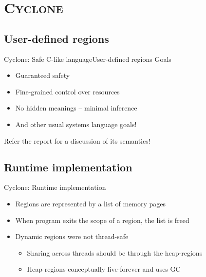 \documentclass[xcolor=x11names,compress]{beamer}
\renewcommand{\(}{\begin{columns}}
\renewcommand{\)}{\end{columns}}
\newcommand{\<}[1]{\begin{column}{#1}}
\renewcommand{\>}{\end{column}}
\begin{document}
\section{\scshape Cyclone}
\subsection{User-defined regions}
\begin{frame}{Cyclone: Safe C-like language}{User-defined regions}
    {\large Goals}
    \begin{itemize}
        \item Guaranteed safety
        \pause
        \item Fine-grained control over resources
        \pause
        \item No hidden meanings -- minimal inference
        \pause
        \item And other usual systems language goals!
    \end{itemize}
    \pause
    \vspace{1em}
    \small Refer the report for a discussion of its semantics!
\end{frame}

\subsection{Runtime implementation}
\begin{frame}{Cyclone: Runtime implementation}
    \begin{itemize}
        \item Regions are represented by a list of memory pages
        \pause
        \item When program exits the scope of a region, the list is freed
        \pause
        \item Dynamic regions were not thread-safe
        \pause
        \begin{itemize}
            \item Sharing across threads should be through the heap-regions
            \item Heap regions conceptually live-forever and uses GC
        \end{itemize}
    \end{itemize}
\end{frame}
\end{document}

